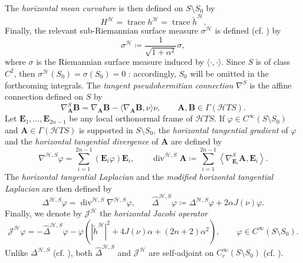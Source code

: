 \documentclass[11pt]{amsart}
\renewcommand{\geq}{\geqslant}
\newcommand{\hhh}{{\mathcal{H}}}
\newcommand{\A}{\mathbf{A}}
\newcommand{\B}{\mathbf{B}}
\newcommand{\vh}{\nu}
\newcommand{\eps}{\varepsilon}
\newcommand{\E}{\mathbf{E}}
\DeclareMathOperator{\divv}{div}
\DeclareMathOperator{\trace}{trace}
\newcommand{\jacobi}{\mathcal{J}}
\theoremstyle{definition}
\theoremstyle{remark}
\numberwithin{equation}{section}
\begin{document}
The \emph{horizontal mean curvature} is then defined on $S\setminus S_0$ by
\begin{equation*}
    H^\hhh=\trace h^\hhh=\trace \tilde h^\hhh.
\end{equation*}
Finally, the relevant sub-Riemannian surface measure $\sigma^\hhh$ is defined (cf. \cite{MR2354992, MR2262196}) by
\begin{equation}\label{areaelementorizz}
    \sigma^\hhh\coloneqq \frac{1}{\sqrt{1+\alpha^2}}\sigma,
\end{equation}
where $\sigma$ is the Riemannian surface measure induced by $\langle\cdot,\cdot\rangle$. Since $S$ is of class $C^2$, then $\sigma^\hhh(S_0)=\sigma(S_0)=0$ \cite{MR2021034}: accordingly, $S_0$ will be omitted in the forthcoming integrals.
The \emph{tangent pseudohermitian connection} $\nabla^S$ is the affine connection defined on $S$ by
\begin{equation*}
    \nabla^S _\A \B=\nabla_\A\B-\langle\nabla_\A\B,\vh\rangle\vh,\qquad \A,\B\in\Gamma(\hhh TS).
\end{equation*}
Let $\E_1,\ldots,\E_{2n-1}$ be any local orthonormal frame of $\hhh TS$. If $\varphi\in C^\infty(S\setminus S_0)$ and $\A\in\Gamma(\hhh TS)$ is supported in $S\setminus S_0$, the \emph{horizontal tangential gradient} of $\varphi$ and the  \emph{horizontal tangential divergence} of $\A$ are defined by 
\begin{equation*}
    \nabla ^{\hhh,S}\varphi=\sum_{i=1}^{2n-1}\left(\E_i\varphi\right)\E_i,\qquad \divv^{\hhh,S}\A\coloneqq\sum_{i=1}^{2n-1}\left\langle \nabla^S_{\E_i}\A,\E_i\right\rangle.
\end{equation*}
The \emph{horizontal tangential Laplacian} and the \emph{modified horizontal tangential Laplacian} are then defined by
\begin{equation*}
    \Delta^{\hhh,S} \varphi=\divv^{\hhh,S}\nabla^{\hhh,S}\varphi,\qquad \hat\Delta^{\hhh,S}\varphi\coloneqq \Delta^{\hhh,S}\varphi +2\alpha J(\vh)\varphi.
\end{equation*}
   Finally, we denote by $\jacobi^\hhh$ the \emph{horizontal Jacobi operator}
    \begin{equation*}\label{horizontaljacopdefmain}
    \jacobi^\hhh \varphi=-\hat\Delta^{\hhh,S}\varphi-\varphi\left(|\tilde h^\hhh|^2+4J(\vh)\alpha+(2n+2)\alpha^2\right),\qquad\varphi\in C^\infty(S\setminus S_0).
    \end{equation*}
    Unlike $\Delta^{\hhh,S}$  (cf. \cite{MR2354992}), both $\hat\Delta^{\hhh,S}$ and $\jacobi^\hhh$ are self-adjoint on $C^\infty_c(S\setminus S_0)$ (cf. ).   
\end{document}
